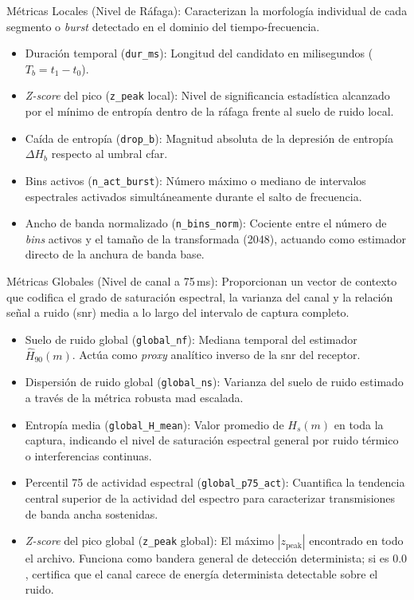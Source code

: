 Métricas Locales (Nivel de Ráfaga):
Caracterizan la morfología individual de cada segmento o \textit{burst} detectado en el dominio del tiempo-frecuencia.
\begin{itemize}\itemsep 0em
    \item Duración temporal (\texttt{dur\_ms}): Longitud del candidato en milisegundos ($T_b = t_1 - t_0$).
    \item \textit{Z-score} del pico (\texttt{z\_peak} local): Nivel de significancia estadística alcanzado por el mínimo de entropía dentro de la ráfaga frente al suelo de ruido local.
    \item Caída de entropía (\texttt{drop\_b}): Magnitud absoluta de la depresión de entropía $\Delta H_b$ respecto al umbral \gls{cfar}.
    \item Bins activos (\texttt{n\_act\_burst}): Número máximo o mediano de intervalos espectrales activados simultáneamente durante el salto de frecuencia.
    \item Ancho de banda normalizado (\texttt{n\_bins\_norm}): Cociente entre el número de \textit{bins} activos y el tamaño de la transformada (2048), actuando como estimador directo de la anchura de banda base.
\end{itemize}

Métricas Globales (Nivel de canal a 75\,ms):
Proporcionan un vector de contexto que codifica el grado de saturación espectral, la varianza del canal y la relación señal a ruido (\gls{snr}) media a lo largo del intervalo de captura completo.
\begin{itemize}\itemsep 0em
    \item Suelo de ruido global (\texttt{global\_nf}): Mediana temporal del estimador $\widehat{H}_{90}(m)$. Actúa como \textit{proxy} analítico inverso de la \gls{snr} del receptor.
    \item Dispersión de ruido global (\texttt{global\_ns}): Varianza del suelo de ruido estimado a través de la métrica robusta \gls{mad} escalada.
    \item Entropía media (\texttt{global\_H\_mean}): Valor promedio de $H_s(m)$ en toda la captura, indicando el nivel de saturación espectral general por ruido térmico o interferencias continuas.
    \item Percentil 75 de actividad espectral (\texttt{global\_p75\_act}): Cuantifica la tendencia central superior de la actividad del espectro para caracterizar transmisiones de banda ancha sostenidas.
    \item \textit{Z-score} del pico global (\texttt{z\_peak} global): El máximo $|z_{\text{peak}}|$ encontrado en todo el archivo. Funciona como bandera general de detección determinista; si es $0.0$, certifica que el canal carece de energía determinista detectable sobre el ruido.
\end{itemize}

